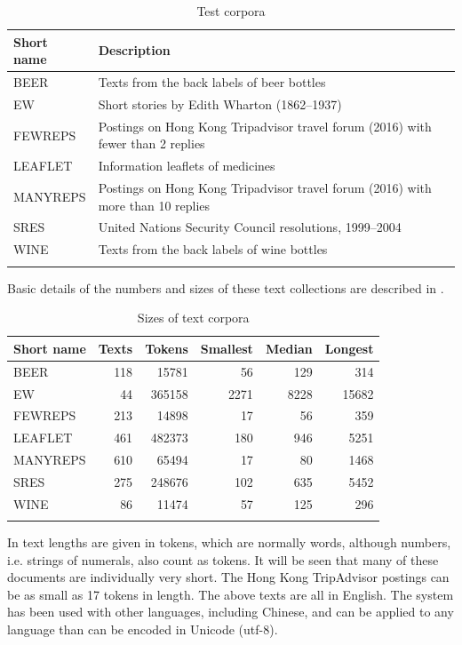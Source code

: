 \documentclass[output=paper]{langscibook}
\begin{document}
\begin{table}
\caption{Test corpora\label{tab:forsyth:1}}
\begin{tabularx}{\textwidth}{lQ}
\lsptoprule
Short name & Description\\\midrule
BEER & Texts from the back labels of beer bottles\\
EW & Short stories by Edith Wharton (1862--1937)\\
FEWREPS & Postings on Hong Kong Tripadvisor travel forum (2016) with fewer than 2 replies\\
LEAFLET & Information leaflets of medicines\\
MANYREPS & Postings on Hong Kong Tripadvisor travel forum (2016) with more than 10 replies\\
SRES & United Nations Security Council resolutions, 1999--2004\\
WINE & Texts from the back labels of wine bottles\\
\lspbottomrule
\end{tabularx}
\end{table}

Basic details of the numbers and sizes of these text collections are described in .

\begin{table}
\caption{Sizes of text corpora\label{tab:forsyth:2}}
\begin{tabular}{lrrrrr}
\lsptoprule
Short name & Texts & Tokens & Smallest & Median & Longest\\
\midrule
BEER &  118 &  15781 &  56 &  129 &  314\\
EW &  44 &  365158 &  2271 &  8228 &  15682\\
FEWREPS &  213 &  14898 &  17 &  56 &  359\\
LEAFLET &  461 &  482373 &  180 &  946 &  5251\\
MANYREPS &  610 &  65494 &  17 &  80 &  1468\\
SRES &  275 &  248676 &  102 &  635 &  5452\\
WINE &  86 &  11474 &  57 &  125 &  296\\
\lspbottomrule
\end{tabular}
\end{table}

In  text lengths are given in tokens, which are normally words, although numbers, i.e. strings of numerals, also count as tokens. It will be seen that many of these documents are individually very short. The Hong Kong TripAdvisor postings can be as small as 17 tokens in length. The above texts are all in English. The system has been used with other languages, including Chinese, and can be applied to any language than can be encoded in Unicode (utf-8).
\end{document}
